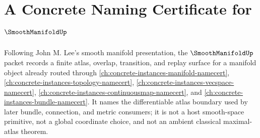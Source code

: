 \chapter{A Concrete Naming Certificate for $\SmoothManifoldUp$}
\label{ch:concrete-instances-smoothmanifold-namecert}

Following John M. Lee's smooth manifold presentation, the $\SmoothManifoldUp$ packet records a finite atlas, overlap, transition, and replay surface for a manifold object already routed through \autoref{ch:concrete-instances-manifold-namecert}, \autoref{ch:concrete-instances-topology-namecert}, \autoref{ch:concrete-instances-vecspace-namecert}, \autoref{ch:concrete-instances-continuousmap-namecert}, and \autoref{ch:concrete-instances-bundle-namecert}. It names the differentiable atlas boundary used by later bundle, connection, and metric consumers; it is not a host smooth-space primitive, not a global coordinate choice, and not an ambient classical maximal-atlas theorem.

